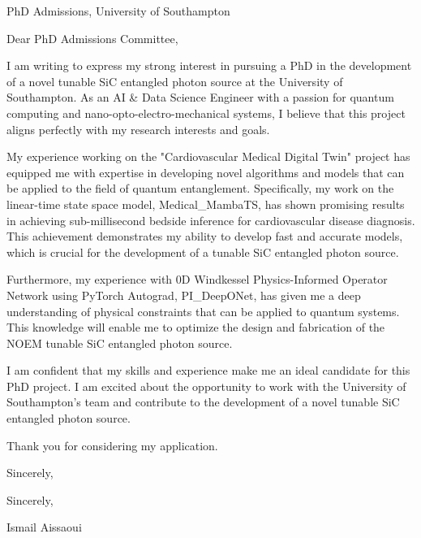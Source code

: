 \documentclass{letter}
\begin{document}
\begin{letter}{PhD Admissions, University of Southampton}
\opening{\noindent Dear PhD Admissions Committee,}

I am writing to express my strong interest in pursuing a PhD in the development of a novel tunable SiC entangled photon source at the University of Southampton. As an AI & Data Science Engineer with a passion for quantum computing and nano-opto-electro-mechanical systems, I believe that this project aligns perfectly with my research interests and goals.

My experience working on the "Cardiovascular Medical Digital Twin" project has equipped me with expertise in developing novel algorithms and models that can be applied to the field of quantum entanglement. Specifically, my work on the linear-time state space model, Medical_MambaTS, has shown promising results in achieving sub-millisecond bedside inference for cardiovascular disease diagnosis. This achievement demonstrates my ability to develop fast and accurate models, which is crucial for the development of a tunable SiC entangled photon source.

Furthermore, my experience with 0D Windkessel Physics-Informed Operator Network using PyTorch Autograd, PI_DeepONet, has given me a deep understanding of physical constraints that can be applied to quantum systems. This knowledge will enable me to optimize the design and fabrication of the NOEM tunable SiC entangled photon source.

I am confident that my skills and experience make me an ideal candidate for this PhD project. I am excited about the opportunity to work with the University of Southampton's team and contribute to the development of a novel tunable SiC entangled photon source.

Thank you for considering my application.

Sincerely,

\closing{\noindent Sincerely,}

Ismail Aissaoui

\end{letter}
\end{document}
